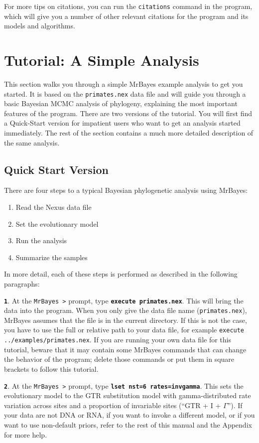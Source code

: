 \documentclass[12pt]{book}
\newcommand{\ttt}[1]{\texttt{#1}}
\newcommand{\tb}[1]{\ttt{\textbf{#1}}}
\begin{document}
For more tips on citations, you can run the \texttt{citations} command in the program, which will
give you a number of other relevant citations for the program and its models and algorithms.

\chapter{Tutorial: A Simple Analysis}\label{tutorialSimple}

This section walks you through a simple MrBayes example analysis to get you started. It is based on
the \texttt{primates.nex} data file and will guide you through a basic Bayesian MCMC analysis of
phylogeny, explaining the most important features of the program. There are two versions of the
tutorial. You will first find a Quick-Start version for impatient users who want to get an analysis
started immediately. The rest of the section contains a much more detailed description of the same
analysis.

\section{Quick Start Version}

There are four steps to a typical Bayesian phylogenetic analysis using MrBayes:
\begin{enumerate}
\item Read the Nexus data file
\item Set the evolutionary model
\item Run the analysis
\item Summarize the samples
\end{enumerate}

In more detail, each of these steps is performed as described in the following paragraphs:

\tb{1}. At the \texttt{MrBayes >} prompt, type \tb{execute primates.nex}. This will bring the data
into the program. When you only give the data file name (\texttt{primates.nex}), MrBayes assumes
that the file is in the current directory. If this is not the case, you have to use the full or
relative path to your data file, for example \texttt{execute ../examples/primates.nex}. If you are
running your own data file for this tutorial, beware that it may contain some MrBayes commands that
can change the behavior of the program; delete those commands or put them in square brackets to
follow this tutorial.

\tb{2}. At the \texttt{MrBayes >} prompt, type \tb{lset nst=6 rates=invgamma}. This sets the
evolutionary model to the GTR substitution model with gamma-distributed rate variation across sites
and a proportion of invariable sites (``GTR + I + $\Gamma$''). If your data are not DNA or RNA, if
you want to invoke a different model, or if you want to use non-default priors, refer to the rest
of this manual and the Appendix for more help.
\end{document}
